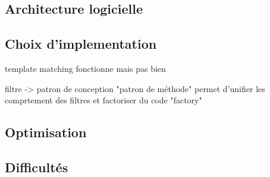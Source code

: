 \subsection{Architecture logicielle}

\subsection{Choix d'implementation}
template matching fonctionne mais pas bien

filtre ->  patron de conception "patron de méthode" permet d'unifier les comprtement des filtres et factoriser du code
			"factory"

\subsection{Optimisation}

\subsection{Difficultés}